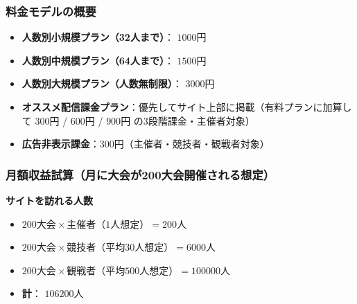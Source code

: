 \subsubsection*{料金モデルの概要}
\begin{itemize}
    \item \textbf{人数別小規模プラン（32人まで）}： $\num{1000} \text{円}$
    \item \textbf{人数別中規模プラン（64人まで）}： $\num{1500} \text{円}$
    \item \textbf{人数別大規模プラン（人数無制限）}： $\num{3000} \text{円}$
    \item \textbf{オススメ配信課金プラン}：優先してサイト上部に掲載（有料プランに加算して $\num{300} \text{円}$ / $\num{600} \text{円}$ / $\num{900} \text{円}$ の3段階課金・主催者対象）
    \item \textbf{広告非表示課金}：$\num{300} \text{円}$（主催者・競技者・観戦者対象）
\end{itemize}

\subsubsection*{月額収益試算（月に大会が200大会開催される想定）}

\textbf{サイトを訪れる人数}
    \begin{itemize}
        \item $\num{200} \text{大会} \times \text{主催者（1人想定）} = \num{200} \text{人}$
        \item $\num{200} \text{大会} \times \text{競技者（平均30人想定）} = \num{6000} \text{人}$
        \item $\num{200} \text{大会} \times \text{観戦者（平均500人想定）}= \num{100000} \text{人}$
        \item \textbf{計}： $\num{106200} \text{人}$
    \end{itemize}

